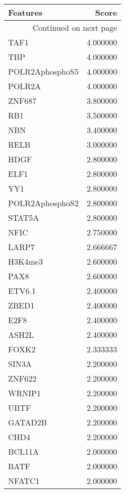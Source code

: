 \begin{longtable}{lr}
\caption{}\\
\toprule
        Features &     Score \\
\midrule
\endhead
\midrule
\multicolumn{2}{r}{{Continued on next page}} \\
\midrule
\endfoot

\bottomrule
\endlastfoot
            TAF1 &  4.000000 \\
             TBP &  4.000000 \\
 POLR2AphosphoS5 &  4.000000 \\
          POLR2A &  4.000000 \\
          ZNF687 &  3.800000 \\
             RB1 &  3.500000 \\
             NBN &  3.400000 \\
            RELB &  3.000000 \\
            HDGF &  2.800000 \\
            ELF1 &  2.800000 \\
             YY1 &  2.800000 \\
 POLR2AphosphoS2 &  2.800000 \\
          STAT5A &  2.800000 \\
            NFIC &  2.750000 \\
           LARP7 &  2.666667 \\
         H3K4me3 &  2.600000 \\
            PAX8 &  2.600000 \\
          ETV6.1 &  2.400000 \\
           ZBED1 &  2.400000 \\
            E2F8 &  2.400000 \\
           ASH2L &  2.400000 \\
           FOXK2 &  2.333333 \\
           SIN3A &  2.200000 \\
          ZNF622 &  2.200000 \\
          WRNIP1 &  2.200000 \\
            UBTF &  2.200000 \\
         GATAD2B &  2.200000 \\
            CHD4 &  2.200000 \\
          BCL11A &  2.000000 \\
            BATF &  2.000000 \\
          NFATC1 &  2.000000 \\

\end{longtable}
